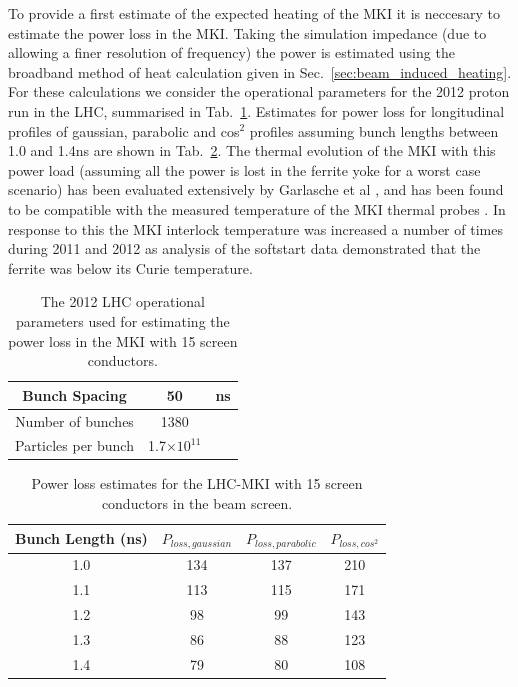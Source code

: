 To provide a first estimate of the expected heating of the MKI it is neccesary to estimate the power loss in the MKI. Taking the simulation impedance (due to allowing a finer resolution of frequency) the power is estimated using the broadband method of heat calculation given in Sec.~\ref{sec:beam_induced_heating}. For these calculations we consider the operational parameters for the 2012 proton run in the LHC, summarised in Tab.~\ref{tab:mki-beam-parameters}. Estimates for power loss for longitudinal profiles of gaussian, parabolic and cos$^{2}$ profiles assuming bunch lengths between 1.0 and 1.4ns are shown in Tab.~\ref{tab:mki-15-heating}. The thermal evolution of the MKI with this power load (assuming all the power is lost in the ferrite yoke for a worst case scenario) has been evaluated extensively by Garlasche et al \cite{Garlasche:2dHeat}, and has been found to be compatible with the measured temperature of the MKI thermal probes \cite{Barnes:mkiHeating}. In response to this the MKI interlock temperature was increased a number of times during 2011 and 2012 as analysis of the softstart data demonstrated that the ferrite was below its Curie temperature.

\begin{table}
\caption{The 2012 LHC operational parameters used for estimating the power loss in the MKI with 15 screen conductors.}
\label{tab:mki-beam-parameters}
\begin{center}
\begin{tabular}{c | c | c}
Bunch Spacing & 50 & ns \\ \hline
Number of bunches & 1380 & \\ \hline
Particles per bunch & 1.7$\times 10^{11}$ & \\
\end{tabular}
\end{center}
\end{table}

\begin{table}
\caption{Power loss estimates for the LHC-MKI with 15 screen conductors in the beam screen.}
\label{tab:mki-15-heating}
\begin{center}
\begin{tabular}{c | c | c | c}
Bunch Length (ns) & $P_{loss, gaussian}$ & $P_{loss, parabolic}$ & $P_{loss, cos^{2}}$ \\ \hline
1.0 & 134 & 137 & 210 \\ \hline
1.1 & 113 & 115 & 171 \\ \hline
1.2 & 98 & 99 & 143 \\ \hline
1.3 & 86 & 88 & 123 \\ \hline
1.4 & 79 & 80 & 108 \\ \hline
\end{tabular}
\end{center}
\end{table}

